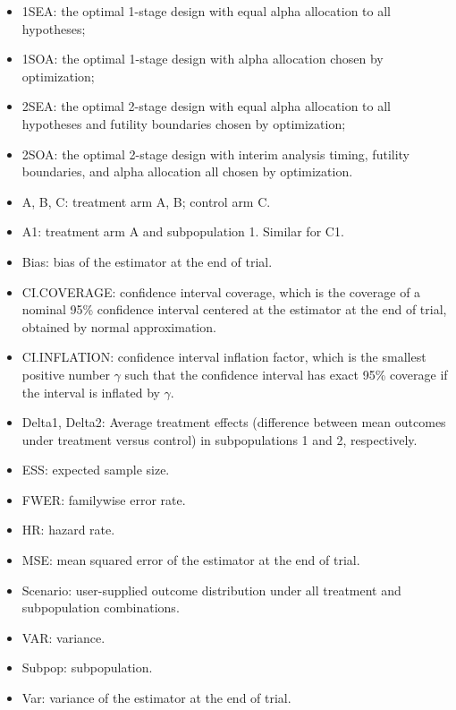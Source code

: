 \documentclass{article}\usepackage[]{graphicx}\usepackage[]{color}
\numberwithin{table}{section}
\numberwithin{figure}{section}
\begin{document}
\begin{itemize}
    \item 1SEA: the optimal 1-stage design with equal alpha allocation to all hypotheses; 
    \item 1SOA: the optimal 1-stage design with alpha allocation chosen by optimization;
    \item 2SEA: the optimal 2-stage design with equal alpha allocation to all hypotheses and futility boundaries chosen by optimization;
    \item 2SOA: the optimal 2-stage design with interim analysis timing, futility boundaries, and alpha allocation all chosen by optimization.
    \item A, B, C: treatment arm A, B; control arm C.
    \item A1: treatment arm A and subpopulation 1. Similar for C1. 
    \item Bias: bias of the estimator at the end of trial.
    \item CI.COVERAGE: confidence interval coverage, which is the coverage of a nominal 95\% confidence interval centered at the estimator at the end of trial, obtained by normal approximation.
    \item CI.INFLATION: confidence interval inflation factor, which is the smallest positive number $\gamma$ such that the confidence interval has exact 95\% coverage if the interval is inflated by $\gamma$.
    \item Delta1, Delta2: Average treatment effects (difference between mean outcomes under treatment versus control) in subpopulations 1 and 2, respectively.
    \item ESS: expected sample size.
    \item FWER: familywise error rate.
    \item HR: hazard rate.
    \item MSE: mean squared error of the estimator at the end of trial.
    \item Scenario: user-supplied outcome distribution under all treatment and subpopulation combinations.
    \item VAR: variance.
    \item Subpop: subpopulation.
    \item Var: variance of the estimator at the end of trial.
\end{itemize}
\end{document}
